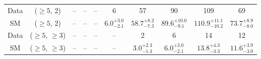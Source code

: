 \begin{table}[h!]
{\begin{tabular}{cccccccccc}
	Data & ($\ge5$, 2) & -- & -- & -- & 6 & 57 & 90 & 109 & 69 \\[0.5ex] 
	SM & ($\ge5$, 2) & -- & -- & -- & $6.0^{+ 3.0 }_{- 2.1 }$ & $58.7^{+ 8.2 }_{- 7.3 }$ & $89.6^{+ 10.0 }_{- 9.1 }$ & $110.9^{+ 11.1 }_{- 10.2 }$ & $73.7^{+ 8.9 }_{- 8.0 }$ \\[0.5ex] 
	Data & ($\ge5$, $\ge3$) & -- & -- & -- & -- & 2 & 6 & 14 & 12 \\[0.5ex] 
	SM & ($\ge5$, $\ge3$) & -- & -- & -- & -- & $3.0^{+ 2.3 }_{- 1.3 }$ & $6.0^{+ 3.0 }_{- 2.1 }$ & $13.8^{+ 4.3 }_{- 3.3 }$ & $11.6^{+ 3.9 }_{- 3.0 }$ \\[0.5ex] 
	\hline
	\hline
\end{tabular}}
\end{table}
